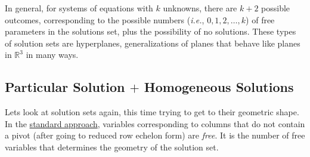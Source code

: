 In general, for systems of equations with $k$ unknowns, there are $k+2$ possible outcomes, corresponding to the possible numbers ({\itshape i.e.}, $0,1,2,\dots,k$) of free parameters in the solutions set, plus the possibility of no solutions.  These types of solution sets are hyperplanes, generalizations of planes that behave like planes in $\mathbb{R}^3$ in many ways.









\subsection{\! Particular Solution \hspace{-.7mm}$+$\hspace{-.7mm} Homogeneous Solutions }

Lets look at solution sets again, this time trying to get to their geometric shape.
In the \hyperlink{standard approach}{standard approach}, variables corresponding to columns that do not contain a pivot (after going to reduced row echelon form) are \emph{free}.  It is the number of free variables that determines the geometry of the solution set. 

